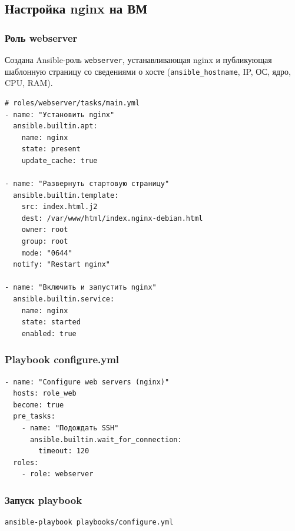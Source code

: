 \documentclass[12pt,a4paper]{article}
\begin{document}
\subsection{Настройка nginx на ВМ}

\subsubsection{Роль webserver}

Создана Ansible-роль \texttt{webserver}, устанавливающая nginx и публикующая шаблонную страницу со сведениями о хосте (\texttt{ansible\_hostname}, IP, ОС, ядро, CPU, RAM).

\begin{lstlisting}
# roles/webserver/tasks/main.yml
- name: "Установить nginx"
  ansible.builtin.apt:
    name: nginx
    state: present
    update_cache: true

- name: "Развернуть стартовую страницу"
  ansible.builtin.template:
    src: index.html.j2
    dest: /var/www/html/index.nginx-debian.html
    owner: root
    group: root
    mode: "0644"
  notify: "Restart nginx"

- name: "Включить и запустить nginx"
  ansible.builtin.service:
    name: nginx
    state: started
    enabled: true
\end{lstlisting}

\subsubsection{Playbook configure.yml}

\begin{lstlisting}
- name: "Configure web servers (nginx)"
  hosts: role_web
  become: true
  pre_tasks:
    - name: "Подождать SSH"
      ansible.builtin.wait_for_connection:
        timeout: 120
  roles:
    - role: webserver
\end{lstlisting}

\subsubsection{Запуск playbook}

\begin{lstlisting}
ansible-playbook playbooks/configure.yml
\end{lstlisting}
\end{document}
